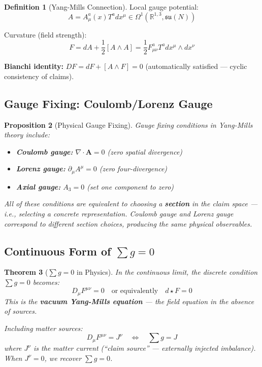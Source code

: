 \documentclass[12pt,a4paper]{article}
\theoremstyle{plain}
\newtheorem{theorem}{Theorem}[section]
\newtheorem{proposition}[theorem]{Proposition}
\theoremstyle{definition}
\newtheorem{definition}[theorem]{Definition}
\newcommand{\R}{\mathbb{R}}
\begin{document}
\begin{definition}[Yang-Mills Connection]
Local gauge potential:
\begin{equation}
    A = A_\mu^a(x) T^a dx^\mu \in \Omega^1(\R^{1,3}, \mathfrak{su}(N))
\end{equation}

Curvature (field strength):
\begin{equation}
    F = dA + \frac{1}{2}[A \wedge A] = \frac{1}{2} F_{\mu\nu}^a T^a dx^\mu \wedge dx^\nu
\end{equation}

\textbf{Bianchi identity:} $DF = dF + [A \wedge F] = 0$ (automatically satisfied — cyclic consistency of claims).
\end{definition}

\subsection{Gauge Fixing: Coulomb/Lorenz Gauge}

\begin{proposition}[Physical Gauge Fixing]
Gauge fixing conditions in Yang-Mills theory include:
\begin{itemize}
    \item \textbf{Coulomb gauge:} $\nabla \cdot \mathbf{A} = 0$ (zero spatial divergence)
    \item \textbf{Lorenz gauge:} $\partial_\mu A^\mu = 0$ (zero four-divergence)
    \item \textbf{Axial gauge:} $A_3 = 0$ (set one component to zero)
\end{itemize}

All of these conditions are equivalent to choosing a \textbf{section} in the claim space — i.e., selecting a concrete representation.
Coulomb gauge and Lorenz gauge correspond to different section choices, producing the same physical observables.
\end{proposition}

\subsection{Continuous Form of $\sum g = 0$}

\begin{theorem}[$\sum g = 0$ in Physics]
In the continuous limit, the discrete condition $\sum g = 0$ becomes:
\begin{equation}
    D_\mu F^{\mu\nu} = 0 \quad \text{or equivalently} \quad d \star F = 0
\end{equation}
This is the \textbf{vacuum Yang-Mills equation} — the field equation in the absence of sources.

Including matter sources:
\begin{equation}
    D_\mu F^{\mu\nu} = J^\nu \quad \Longleftrightarrow \quad \sum g = J
\end{equation}
where $J^\nu$ is the matter current (``claim source'' — externally injected imbalance).
When $J^\nu = 0$, we recover $\sum g = 0$.
\end{theorem}
\end{document}
